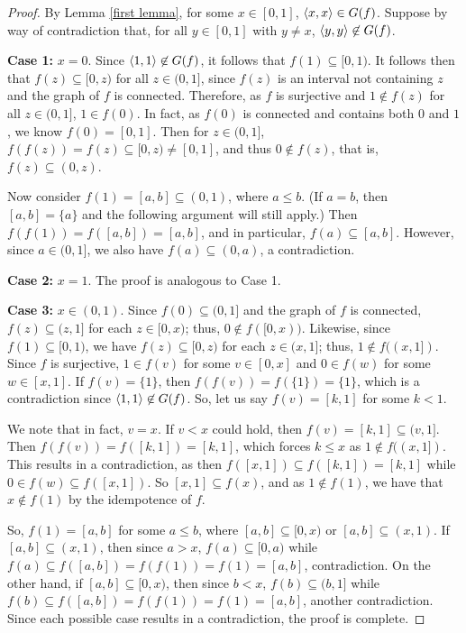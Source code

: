\documentclass{amsart}
\theoremstyle{definition}
\begin{document}
\begin{proof}
By Lemma \ref{first lemma}, for some $x \in [0,1]$, $\langle x,x\rangle \in G(f)$. Suppose by way of contradiction that, for all $y \in [0,1]$ with $y \not= x$, $\langle y,y\rangle \not\in G(f)$.

\textbf{Case 1:}
$x = 0$. Since $\langle1,1\rangle \not\in G(f)$, it follows that $f(1) \subseteq [0,1)$. It follows then that $f(z)\subseteq[0,z)$ for all $z\in(0,1]$, since $f(z)$ is an interval not containing $z$ and the graph of $f$ is connected. Therefore, as $f$ is surjective and $1 \not\in f(z)$ for all $z \in (0,1]$, $1 \in f(0)$. In fact, as $f(0)$ is connected and contains both $0$ and $1$, we know $f(0) = [0,1]$. Then for $z \in (0,1]$, $f(f(z))=f(z)\subseteq[0,z)\not=[0,1]$, and thus $0\not\in f(z)$, that is, $f(z)\subseteq(0,z)$.

Now consider $f(1)=[a,b]\subseteq(0,1)$, where $a \le b$. (If $a = b$, then $[a,b] = \{a\}$ and the following argument will still apply.) Then $f(f(1))=f([a,b])=[a,b]$, and in particular, $f(a)\subseteq[a,b]$. However, since $a\in(0,1]$, we also have $f(a)\subseteq(0,a)$, a contradiction.


\textbf{Case 2:}
$x = 1$. The proof is analogous to Case 1.


\textbf{Case 3:}
$x \in (0,1)$. Since $f(0) \subseteq (0,1]$ and the graph of $f$ is connected, $f(z) \subseteq (z,1]$ for each $z \in [0,x)$; thus, $0 \not\in f([0,x))$. Likewise,  since $f(1) \subseteq [0,1)$, we have $f(z) \subseteq [0,z)$ for each $z \in (x,1]$; thus, $1 \not\in f((x,1])$. Since $f$ is surjective, $1\in f(v)$ for some $v\in[0,x]$ and $0\in f(w)$ for some $w\in[x,1]$. If $f(v) = \{1\}$, then $f(f(v)) = f(\{1\}) = \{1\}$, which is a contradiction since $\langle1,1\rangle \not\in G(f)$. So, let us say $f(v) = [k,1]$ for some $k < 1$.

We note that in fact, $v=x$. If $v<x$ could hold, then $f(v)=[k,1]\subseteq(v,1]$. Then $f(f(v))=f([k,1])=[k,1]$, which forces $k\leq x$ as $1\not\in f((x,1])$. This results in a contradiction, as then $f([x,1])\subseteq f([k,1])=[k,1]$ while $0\in f(w)\subseteq f([x,1])$. So $[x,1]\subseteq f(x)$, and as $1\not\in f(1)$, we have that $x\not\in f(1)$ by the idempotence of $f$.

So, $f(1) = [a,b]$ for some $a \le b$, where $[a,b] \subseteq [0,x)$ or $[a,b] \subseteq (x,1)$. If $[a,b] \subseteq (x,1)$, then since $a > x$, $f(a) \subseteq [0,a)$ while $f(a)\subseteq f([a,b])=f(f(1))=f(1)=[a,b]$, contradiction. On the other hand, if $[a,b] \subseteq [0,x)$, then since $b<x$, $f(b) \subseteq (b,1]$ while $f(b) \subseteq f([a,b])=f(f(1))=f(1)=[a,b]$, another contradiction. Since each possible case results in a contradiction, the proof is complete.
\end{proof}
\end{document}
